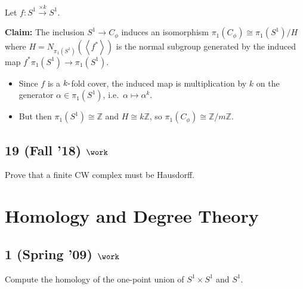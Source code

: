 \begin{solution}

\hfill

\begin{concept}

\hfill

\end{concept}

Let \(f: S^1 \xrightarrow{\times k} S^1\).

\textbf{Claim:} The inclusion \(S^1 \to C_\phi\) induces an isomorphism
\(\pi_1(C_\phi) \cong \pi_1(S^1) / H\) where
\(H = N_{\pi_1(S^1)}(\left\langle{f^*}\right\rangle)\) is the normal
subgroup generated by the induced map \(f^* \pi_1(S^1) \to \pi_1(S^1)\).

\begin{itemize}
\item
  Since \(f\) is a \(k{\hbox{-}}\)fold cover, the induced map is
  multiplication by \(k\) on the generator \(\alpha \in \pi_1(S^1)\),
  i.e.~\(\alpha \mapsto \alpha^k\).
\item
  But then \(\pi_1(S^1) \cong {\mathbb{Z}}\) and
  \(H \cong k{\mathbb{Z}}\), so
  \(\pi_1(C_\phi) \cong {\mathbb{Z}}/m{\mathbb{Z}}\).
\end{itemize}

\end{solution}

\hypertarget{fall-18-work-2}{%
\subsection{\texorpdfstring{19 (Fall '18)
\(\work\)}{19 (Fall '18) \textbackslash work}}\label{fall-18-work-2}}

Prove that a finite CW complex must be Hausdorff.

\hypertarget{homology-and-degree-theory}{%
\section{Homology and Degree Theory}\label{homology-and-degree-theory}}

\hypertarget{spring-09-work-3}{%
\subsection{\texorpdfstring{1 (Spring '09)
\(\work\)}{1 (Spring '09) \textbackslash work}}\label{spring-09-work-3}}

Compute the homology of the one-point union of \(S^1 \times S^1\) and
\(S^1\).

